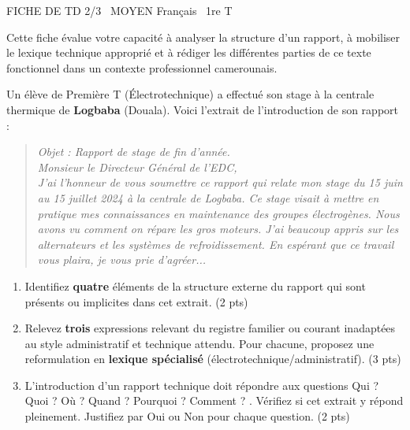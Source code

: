 \documentclass[11pt]{article}
\begin{document}
\pagestyle{empty}

\begin{tcolorbox}[enhanced,colback=popink,colframe=popink,arc=10pt,boxrule=0pt,left=12pt,right=12pt,top=9pt,bottom=9pt]
{\color{white}\popxbold\small FICHE DE TD 2/3 \textbullet\ MOYEN \hfill Français \textbullet\ 1re T\par}
\end{tcolorbox}
\vspace{4pt}

\noindent Cette fiche évalue votre capacité à analyser la structure d'un rapport, à mobiliser le lexique technique approprié et à rédiger les différentes parties de ce texte fonctionnel dans un contexte professionnel camerounais.

\begin{exercice}
Un élève de Première T (Électrotechnique) a effectué son stage à la centrale thermique de \textbf{Logbaba} (Douala). Voici l'extrait de l'introduction de son rapport :

\begin{quote}
\og \itshape
Objet : Rapport de stage de fin d'année.\\
Monsieur le Directeur Général de l'EDC, \\
J'ai l'honneur de vous soumettre ce rapport qui relate mon stage du 15 juin au 15 juillet 2024 à la centrale de Logbaba. Ce stage visait à mettre en pratique mes connaissances en maintenance des groupes électrogènes. Nous avons vu comment on répare les gros moteurs. J'ai beaucoup appris sur les alternateurs et les systèmes de refroidissement. En espérant que ce travail vous plaira, je vous prie d'agréer...\fg
\end{quote}

\begin{enumerate}
    \item Identifiez \textbf{quatre} éléments de la structure externe du rapport qui sont présents ou implicites dans cet extrait. (2 pts)
    \item Relevez \textbf{trois} expressions relevant du registre familier ou courant inadaptées au style administratif et technique attendu. Pour chacune, proposez une reformulation en \textbf{lexique spécialisé} (électrotechnique/administratif). (3 pts)
    \item L'introduction d'un rapport technique doit répondre aux questions \og Qui ? Quoi ? Où ? Quand ? Pourquoi ? Comment ? \fg. Vérifiez si cet extrait y répond pleinement. Justifiez par \og Oui \fg ou \og Non \fg pour chaque question. (2 pts)
\end{enumerate}
\end{exercice}
\end{document}
